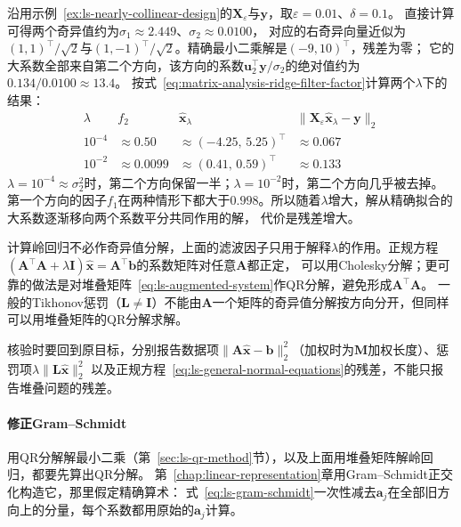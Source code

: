 \begin{example}[近共线设计上的岭回归]
\label{ex:ls-ridge-nearly-collinear}
沿用示例~\ref{ex:ls-nearly-collinear-design}的$\bm X_\varepsilon$与$\bm y$，取$\varepsilon=0.01$、$\delta=0.1$。
直接计算可得两个奇异值约为$\sigma_1\approx2.449$、$\sigma_2\approx0.0100$，
对应的右奇异向量近似为$(1,1)^\top/\sqrt2$与$(1,-1)^\top/\sqrt2$。精确最小二乘解是$(-9,10)^\top$，残差为零；
它的大系数全部来自第二个方向，该方向的系数$\bm u_2^\top\bm y/\sigma_2$的绝对值约为$0.134/0.0100\approx13.4$。
按式~\eqref{eq:matrix-analysis-ridge-filter-factor}计算两个$\lambda$下的结果：
\[
 \begin{array}{cccc}
  \lambda & f_2 & \hat{\bm x}_\lambda & \lVert\bm X_\varepsilon\hat{\bm x}_\lambda-\bm y\rVert_2\\[2pt]
  10^{-4} & \approx0.50 & \approx(-4.25,\,5.25)^\top & \approx0.067\\
  10^{-2} & \approx0.0099 & \approx(0.41,\,0.59)^\top & \approx0.133
 \end{array}
\]
$\lambda=10^{-4}\approx\sigma_2^2$时，第二个方向保留一半；$\lambda=10^{-2}$时，第二个方向几乎被去掉。
第一个方向的因子$f_1$在两种情形下都大于$0.998$。所以随着$\lambda$增大，解从精确拟合的大系数逐渐移向两个系数平分共同作用的解，
代价是残差增大。
\end{example}

计算岭回归不必作奇异值分解，上面的滤波因子只用于解释$\lambda$的作用。正规方程$(\bm A^\top\bm A+\lambda\bm I)\hat{\bm x}=\bm A^\top\bm b$的系数矩阵对任意$\bm A$都正定，
可以用Cholesky分解；更可靠的做法是对堆叠矩阵~\eqref{eq:ls-augmented-system}作QR分解，避免形成$\bm A^\top\bm A$。
一般的Tikhonov惩罚（$\bm L\neq\bm I$）不能由$\bm A$一个矩阵的奇异值分解按方向分开，但同样可以用堆叠矩阵的QR分解求解。

核验时要回到原目标，分别报告数据项$\lVert\bm A\hat{\bm x}-\bm b\rVert_2^2$（加权时为$\bm M$加权长度）、惩罚项$\lambda\lVert\bm L\hat{\bm x}\rVert_2^2$
以及正规方程~\eqref{eq:ls-general-normal-equations}的残差，不能只报告堆叠问题的残差。

\paragraph{修正Gram--Schmidt}

用QR分解解最小二乘（第~\ref{sec:ls-qr-method}节），以及上面用堆叠矩阵解岭回归，都要先算出QR分解。
第~\ref{chap:linear-representation}章用Gram--Schmidt正交化构造它，那里假定精确算术：
式~\eqref{eq:ls-gram-schmidt}一次性减去$\bm a_j$在全部旧方向上的分量，每个系数都用原始的$\bm a_j$计算。


